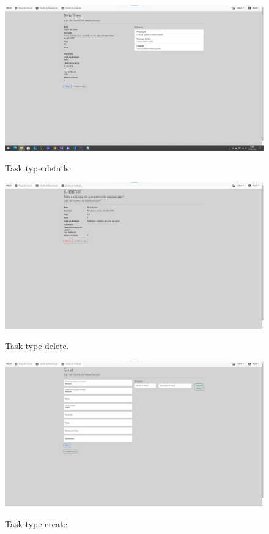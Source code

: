 \begin{figure}[h]
  \caption{Task type details.}
  \centering
  \includegraphics[width=\textwidth]{figs/Implementation/dealershipAdmin/taskDetails}
  \label{fig:taskDetails}
\end{figure}

 
\begin{figure}[h]
  \caption{Task type delete.}
  \centering
  \includegraphics[width=\textwidth]{figs/Implementation/dealershipAdmin/taskDelete}
  \label{fig:taskDelete}
\end{figure}

\begin{figure}[h]
  \caption{Task type create.}
  \centering
  \includegraphics[width=\textwidth]{figs/Implementation/dealershipAdmin/taskCreate}
  \label{fig:taskCreate}
\end{figure}




